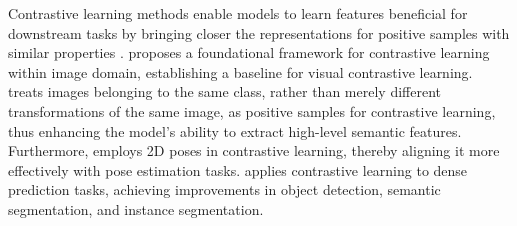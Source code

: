 Contrastive learning methods enable models to learn features beneficial for downstream tasks by bringing closer the representations for positive samples with similar properties \cite{chen_simclr_2020,wang_dense_2021,Mo_2023_WACV,Zheng_2021_ICCV}. \cite{chen_simclr_2020} proposes a foundational framework for contrastive learning within image domain, establishing a baseline for visual contrastive learning. \cite{Zheng_2021_ICCV} treats images belonging to the same class, rather than merely different transformations of the same image, as positive samples for contrastive learning, thus enhancing the model's ability to extract high-level semantic features. Furthermore, \cite{10.1007/978-3-031-19772-7_3} employs 2D poses in contrastive learning, thereby aligning it more effectively with pose estimation tasks. \cite{wang_dense_2021} applies contrastive learning to dense prediction tasks, achieving improvements in object detection, semantic segmentation, and instance segmentation.


